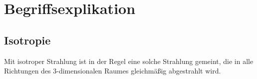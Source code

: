 \chapter{Begriffsexplikation}
\thispagestyle{fancy}
\label{chap:begriffsexplikation}
\section*{Isotropie}
\glqq Mit isotroper Strahlung ist in der Regel eine solche Strahlung gemeint, die in alle Richtungen des 3-dimensionalen Raumes gleichmäßig abgestrahlt wird.\grqq\;\cite{Isotropie}